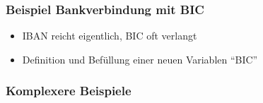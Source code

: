 \documentclass[12pt,ngerman]{beamer}
\begin{document}
\begin{frame}[containsverbatim]
\frametitle{Beispiel Bankverbindung mit BIC}

\begin{itemize}
\item IBAN reicht eigentlich, BIC oft verlangt
\item Definition und Befüllung einer neuen Variablen \enquote{BIC}
\end{itemize}



\end{frame}

\begin{frame}
\frametitle{Komplexere Beispiele}

\begin{center}
\end{center}


\end{frame}
\end{document}
